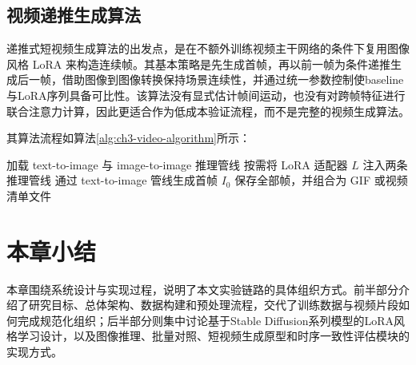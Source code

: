 \subsection{视频递推生成算法}

递推式短视频生成算法的出发点，是在不额外训练视频主干网络的条件下复用图像风格 LoRA 来构造连续帧。其基本策略是先生成首帧，再以前一帧为条件递推生成后一帧，借助图像到图像转换保持场景连续性，并通过统一参数控制使baseline与LoRA序列具备可比性。该算法没有显式估计帧间运动，也没有对跨帧特征进行联合注意力计算，因此更适合作为低成本验证流程，而不是完整的视频生成算法。

其算法流程如算法\ref{alg:ch3-video-algorithm}所示：

\begin{algorithm}[H]
\caption{视频递推生成原型算法}
\label{alg:ch3-video-algorithm}
加载 text-to-image 与 image-to-image 推理管线\;
按需将 LoRA 适配器 $L$ 注入两条推理管线\;
通过 text-to-image 管线生成首帧 $I_0$\;
保存全部帧，并组合为 GIF 或视频清单文件\;
\end{algorithm}

\section{本章小结}

本章围绕系统设计与实现过程，说明了本文实验链路的具体组织方式。前半部分介绍了研究目标、总体架构、数据构建和预处理流程，交代了训练数据与视频片段如何完成规范化组织；后半部分则集中讨论基于Stable Diffusion系列模型的LoRA风格学习设计，以及图像推理、批量对照、短视频生成原型和时序一致性评估模块的实现方式。
